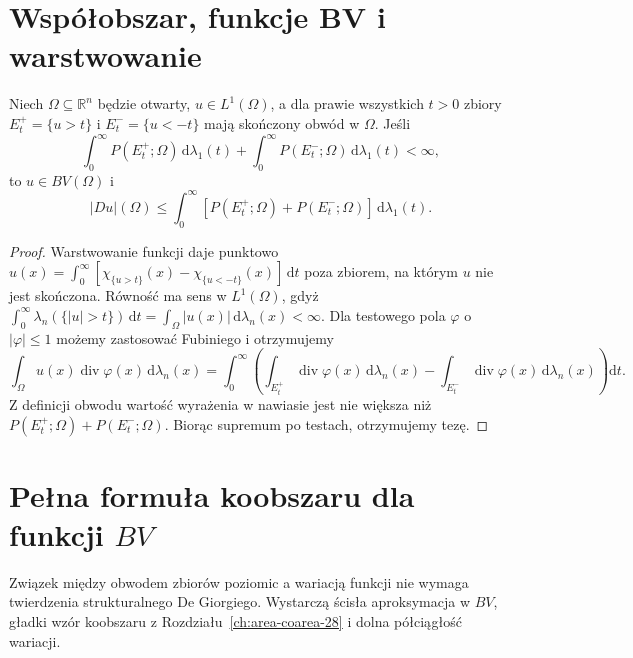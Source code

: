 \section{Współobszar, funkcje BV i warstwowanie}
\begin{twierdzenie}
\label{thm:BV-layercake-29}
Niech $\Omega\subseteq\mathbb R^n$ będzie otwarty,
$u\in L^1(\Omega)$, a dla prawie wszystkich $t>0$
zbiory $E_t^+=\{u>t\}$ i $E_t^-=\{u<-t\}$
mają skończony obwód w $\Omega$. Jeśli
\[
 \int_0^\infty\!P(E_t^+;\Omega)\,\mathrm d\lambda_1(t)
 +\int_0^\infty\!P(E_t^-;\Omega)\,\mathrm d\lambda_1(t)<\infty,
\]
to $u\in BV(\Omega)$ i
\[
 |Du|(\Omega)\le\int_0^\infty
 [P(E_t^+;\Omega)+P(E_t^-;\Omega)]\,
 \mathrm d\lambda_1(t).
\]
\end{twierdzenie}
\begin{proof}
Warstwowanie funkcji daje punktowo
$u(x)=\int_0^\infty[\chi_{\{u>t\}}(x)
-\chi_{\{u<-t\}}(x)]\,\mathrm dt$
poza zbiorem, na którym $u$ nie jest skończona.
Równość ma sens w $L^1(\Omega)$, gdyż
$\int_0^\infty\lambda_n(\{|u|>t\})\,\mathrm dt
=\int_\Omega|u(x)|\,\mathrm d\lambda_n(x)<\infty$.
Dla testowego pola $\varphi$ o $|\varphi|\le1$
możemy zastosować Fubiniego i otrzymujemy
\[
 \int_\Omega u(x)\operatorname{div}\varphi(x)
 \,\mathrm d\lambda_n(x)
 =\int_0^\infty\!\left(
 \int_{E_t^+}\operatorname{div}\varphi(x)
 \,\mathrm d\lambda_n(x)
 -\int_{E_t^-}\operatorname{div}\varphi(x)
 \,\mathrm d\lambda_n(x)\right)\mathrm dt.
\]
Z definicji obwodu wartość wyrażenia w nawiasie
jest nie większa niż
$P(E_t^+;\Omega)+P(E_t^-;\Omega)$.
Biorąc supremum po testach, otrzymujemy tezę.
\end{proof}

\section{Pełna formuła koobszaru dla funkcji $BV$}
Związek między obwodem zbiorów poziomic a wariacją
funkcji nie wymaga twierdzenia strukturalnego De Giorgiego.
Wystarczą ścisła aproksymacja w $BV$, gładki wzór
koobszaru z Rozdziału~\ref{ch:area-coarea-28} i dolna
półciągłość wariacji.

